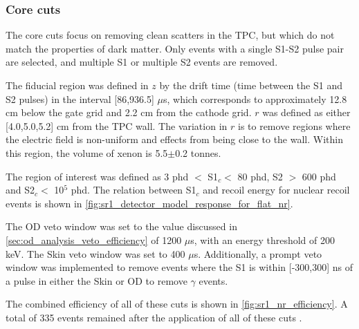 \subsubsection{Core cuts}
The core cuts focus on removing clean scatters in the TPC, but which do not match the properties of dark matter.
Only events with a single S1-S2 pulse pair are selected, and multiple S1 or multiple S2 events are removed.
\par
The fiducial region was defined in $z$ by the drift time (time between the S1 and S2 pulses) in the interval [86,936.5] $\mu$s, which corresponds to approximately 12.8 cm below the gate grid and 2.2 cm from the cathode grid.
$r$ was defined as either [4.0,5.0,5.2] cm from the TPC wall. 
The variation in $r$ is to remove regions where the electric field is non-uniform and effects from being close to the wall.
Within this region, the volume of xenon is 5.5$\pm$0.2 tonnes.
\par
The region of interest was defined as 3 phd $<$ S1$_c <$ 80 phd, S2 $>$ 600 phd and S2$_c <$ 10$^5$ phd.
The relation between S1$_c$ and recoil energy for nuclear recoil events is shown in \autoref{fig:sr1_detector_model_response_for_flat_nr}.
\par
The OD veto window was set to the value discussed in \autoref{sec:od_analysis_veto_efficiency} of 1200 $\mu$s, with an energy threshold of 200 keV.
The Skin veto window was set to 400 $\mu$s.
Additionally, a prompt veto window was implemented to remove events where the S1 is within [-300,300] ns of a pulse in either the Skin or OD to remove $\gamma$ events.

\par
The combined efficiency of all of these cuts is shown in \autoref{fig:sr1_nr_efficiency}.
A total of 335 events remained after the application of all of these cuts \cite{lz_ws_sr1_ref}.


